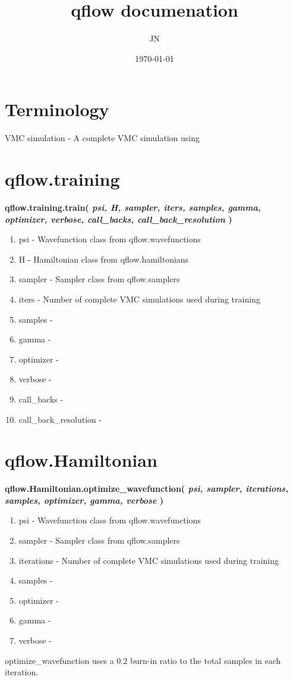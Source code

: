 \documentclass[12pt]{article}
\title{qflow documenation}
\author{
       JN
}
\date{\today}
\begin{document}
\maketitle

\section{Terminology}
VMC simulation - A complete VMC simulation using

\section{qflow.training}
\textbf{ qflow.training.train( \textit{psi,
    H,
    sampler,
    iters,
    samples,
    gamma,
    optimizer,
    verbose,
    call\_backs,
    call\_back\_resolution
    })
}

\begin{enumerate}
\item    psi - Wavefunction class from qflow.wavefunctions 
\item    H - Hamiltonian class from qflow.hamiltonians 
\item    sampler - Sampler class from qflow.samplers
\item    iters - Number of complete VMC simulations used during training
\item    samples -
\item    gamma -
\item    optimizer - 
\item    verbose -
\item    call\_backs -
\item    call\_back\_resolution -
\end{enumerate}



\section{qflow.Hamiltonian}
\textbf{qflow.Hamiltonian.optimize\_wavefunction( \textit{ psi, 
	sampler, 
	iterations, 
	samples,
	optimizer, 
	gamma, 
	verbose 
	})
}

\begin{enumerate}
\item    psi - Wavefunction class from qflow.wavefunctions 
\item    sampler -  Sampler class from qflow.samplers
\item    iterations - Number of complete VMC simulations used during training
\item    samples - 
\item    optimizer -
\item    gamma -
\item    verbose - 
\end{enumerate}

optimize\_wavefunction uses a $0.2$ burn-in ratio to the total samples in each iteration. 
\end{document}
